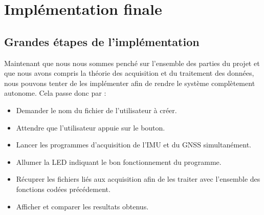 \chapter{Implémentation finale}

\section{Grandes étapes de l'implémentation}


Maintenant que nous nous sommes penché sur l'ensemble des parties du projet et que nous avons compris la théorie des acquisition et du traitement des données, nous pouvons tenter de les implémenter afin de rendre le système complètement autonome. Cela passe donc par :

\begin{itemize}
    \item Demander le nom du fichier de l'utilisateur à créer. 
    \item Attendre que l'utilisateur appuie sur le bouton.
    \item Lancer les programmes d'acquisition de l'IMU et du GNSS simultanément.
    \item Allumer la LED indiquant le bon fonctionnement du programme.
    \item Récuprer les fichiers liés aux acquisition afin de les traiter avec l'ensemble des fonctions codées précédement.
    \item Afficher et comparer les resultats obtenus.
\end{itemize}

